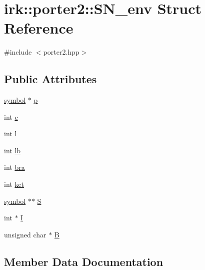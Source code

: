 \hypertarget{structirk_1_1porter2_1_1SN__env}{}\section{irk\+:\+:porter2\+:\+:S\+N\+\_\+env Struct Reference}
\label{structirk_1_1porter2_1_1SN__env}


{\ttfamily \#include $<$porter2.\+hpp$>$}

\subsection*{Public Attributes}
\begin{DoxyCompactItemize}
\item 
\mbox{\hyperlink{namespaceirk_1_1porter2_afd04c4eb58a1dabcf8f3ab2d7e9f9ed5}{symbol}} $\ast$ \mbox{\hyperlink{structirk_1_1porter2_1_1SN__env_ab01405b1f974b543bebe25578a32a287}{p}}
\item 
int \mbox{\hyperlink{structirk_1_1porter2_1_1SN__env_a4671c6fa5973e5a448636808645c51ce}{c}}
\item 
int \mbox{\hyperlink{structirk_1_1porter2_1_1SN__env_a5ee24ad29cae6599727f1a84a4028295}{l}}
\item 
int \mbox{\hyperlink{structirk_1_1porter2_1_1SN__env_a2cbf7049511457e015d1b84187063070}{lb}}
\item 
int \mbox{\hyperlink{structirk_1_1porter2_1_1SN__env_a4ef10c7c841f74a6683858be5c5c7933}{bra}}
\item 
int \mbox{\hyperlink{structirk_1_1porter2_1_1SN__env_a83f65e61491137d9a3c32fa1ebc914d3}{ket}}
\item 
\mbox{\hyperlink{namespaceirk_1_1porter2_afd04c4eb58a1dabcf8f3ab2d7e9f9ed5}{symbol}} $\ast$$\ast$ \mbox{\hyperlink{structirk_1_1porter2_1_1SN__env_ae647b8b0c94342db71b0064e60c18943}{S}}
\item 
int $\ast$ \mbox{\hyperlink{structirk_1_1porter2_1_1SN__env_af0bfa23aa150f05b3f593193465a13c2}{I}}
\item 
unsigned char $\ast$ \mbox{\hyperlink{structirk_1_1porter2_1_1SN__env_a46cc9714bf6b73b7f1884a3e25176ec4}{B}}
\end{DoxyCompactItemize}


\subsection{Member Data Documentation}
\mbox{\label{structirk_1_1porter2_1_1SN__env_a46cc9714bf6b73b7f1884a3e25176ec4}} 
